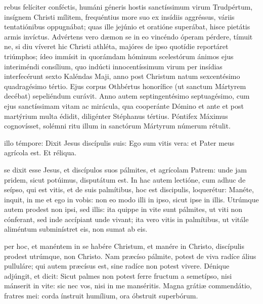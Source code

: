 \documentclass[fontsize=9pt,paper=A6,twoside,BCOR=1mm,DIV=22,headinclude]{scrarticle}
\begin{document}
\begin{multicols}{2}
\RVMTPv 

 rebus felíciter conféctis, humáni géneris hostis sanctíssimum virum Trudpértum, insígnem Christi mílitem, frequéntius more suo ex insídiis aggréssus, váriis tentatiónibus oppugnábat; quas ille jejúnio et oratióne superábat, hisce pietátis armis invíctus. Advértens vero dæmon se in eo vincéndo óperam pérdere, tímuit ne, si diu víveret hic Christi athléta, majóres de ipso quotídie reportáret triúmphos; ídeo immísit in quorámdam hóminum scelestórum ánimos ejus interiméndi consílium, quo indúcti innocentíssimum virum per insídias interfecérunt sexto Kaléndas Maji, anno post Christum natum sexcentésimo quadragésimo tértio. Ejus corpus Othbértus honorífice (ut sanctum Mártyrem decébat) sepeliéndum curávit. Anno autem septingentésimo septuagésimo, cum ejus sanctíssimam vitam ac mirácula, qua cooperánte Dómino et ante et post martýrium multa édidit, diligénter Stéphanus tértius. Póntifex Máximus cognovísset, solémni ritu illum in sanctórum Mártyrum númerum rétulit.

\RVMTPvi 

 illo témpore: 
Dixit Jesus discípulis suis:
Ego sum vitis vera: et Pater meus agrícola est.
Et réliqua.

 se dixit esse Jesus, et discípulos suos pálmites, et agrícolam Patrem: unde jam pridem, sicut potúimus, disputátum est. In hac autem lectióne, cum adhuc de seípso, qui est vitis, et de suis palmítibus, hoc est discipulis, loquerétur: Manéte, inquit, in me et ego in vobis: non eo modo illi in ipso, sicut ipse in illis. Utrúmque autem prodest non ipsi, sed illis: ita quippe in vite sunt pálmites, ut viti non cónferant, sed inde accípiant unde vivant; ita vero vitis in palmítibus, ut vitále aliméntum subminístret eis, non sumat ab eis.

\RVMTPvii

 per hoc, et manéntem in se habére Christum, et manére in Christo, discípulis prodest utrúmque, non Christo. Nam præcíso pálmite, potest de viva radíce álius pulluláre; qui autem præcísus est, sine radíce non potest vivere. Dénique adjúngit, et dicit: Sicut palmes non potest ferre fructum a semetípso, nisi mánserit in vite: sic nec vos, nisi in me manséritis. Magna grátiæ commendátio, fratres mei: corda ínstruit humílium, ora óbstruit superbórum.


\end{multicols}
\end{document}
